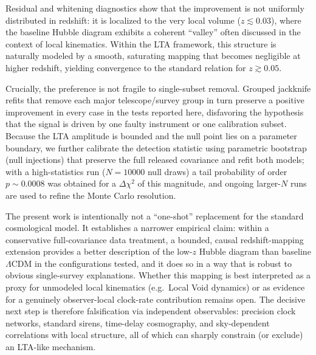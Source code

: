 \documentclass[10pt]{article}
\begin{document}
Residual and whitening diagnostics show that the improvement is not uniformly distributed in redshift:
it is localized to the very local volume ($z\lesssim 0.03$), where the baseline Hubble diagram
exhibits a coherent ``valley'' often discussed in the context of local kinematics. Within the LTA
framework, this structure is naturally modeled by a smooth, saturating mapping that becomes
negligible at higher redshift, yielding convergence to the standard relation for $z\gtrsim 0.05$.

Crucially, the preference is not fragile to single-subset removal. Grouped jackknife refits that
remove each major telescope/survey group in turn preserve a positive improvement in every case in
the tests reported here, disfavoring the hypothesis that the signal is driven by one faulty
instrument or one calibration subset. Because the LTA amplitude is bounded and the null point lies
on a parameter boundary, we further calibrate the detection statistic using parametric bootstrap
(null injections) that preserve the full released covariance and refit both models; with a
high-statistics run ($N=10000$ null draws) a tail probability of order $p\sim 0.0008$ was obtained for
a $\Delta\chi^2$ of this magnitude, and ongoing larger-$N$ runs are used to refine the Monte Carlo
resolution.

The present work is intentionally not a ``one-shot'' replacement for the standard cosmological model.
It establishes a narrower empirical claim: within a conservative full-covariance data treatment, a
bounded, causal redshift-mapping extension provides a better description of the low-$z$ Hubble
diagram than baseline $\Lambda$CDM in the configurations tested, and it does so in a way that is
robust to obvious single-survey explanations. Whether this mapping is best interpreted as a proxy
for unmodeled local kinematics (e.g.\ Local Void dynamics) or as evidence for a genuinely
observer-local clock-rate contribution remains open. The decisive next step is therefore
falsification via independent observables: precision clock networks, standard sirens, time-delay
cosmography, and sky-dependent correlations with local structure, all of which can sharply constrain
(or exclude) an LTA-like mechanism.
\end{document}
